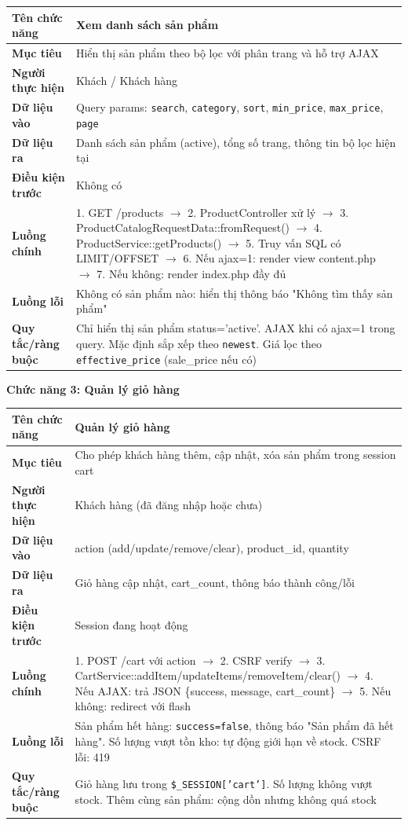 \documentclass[a4paper]{article}
\begin{document}
\begin{longtable}{|p{3.5cm}|p{10.5cm}|}
\hline
\textbf{Tên chức năng} & Xem danh sách sản phẩm \\
\hline
\textbf{Mục tiêu} & Hiển thị sản phẩm theo bộ lọc với phân trang và hỗ trợ AJAX \\
\hline
\textbf{Người thực hiện} & Khách / Khách hàng \\
\hline
\textbf{Dữ liệu vào} & Query params: \texttt{search}, \texttt{category}, \texttt{sort}, \texttt{min\_price}, \texttt{max\_price}, \texttt{page} \\
\hline
\textbf{Dữ liệu ra} & Danh sách sản phẩm (active), tổng số trang, thông tin bộ lọc hiện tại \\
\hline
\textbf{Điều kiện trước} & Không có \\
\hline
\textbf{Luồng chính} & 1. GET /products $\to$ 2. ProductController xử lý $\to$ 3. ProductCatalogRequestData::fromRequest() $\to$ 4. ProductService::getProducts() $\to$ 5. Truy vấn SQL có LIMIT/OFFSET $\to$ 6. Nếu ajax=1: render view content.php $\to$ 7. Nếu không: render index.php đầy đủ \\
\hline
\textbf{Luồng lỗi} & Không có sản phẩm nào: hiển thị thông báo "Không tìm thấy sản phẩm" \\
\hline
\textbf{Quy tắc/ràng buộc} & Chỉ hiển thị sản phẩm status='active'. AJAX khi có ajax=1 trong query. Mặc định sắp xếp theo \texttt{newest}. Giá lọc theo \texttt{effective\_price} (sale\_price nếu có) \\
\hline
\end{longtable}

\vspace{0.5cm}
\noindent\textbf{Chức năng 3: Quản lý giỏ hàng}

\begin{longtable}{|p{3.5cm}|p{10.5cm}|}
\hline
\textbf{Tên chức năng} & Quản lý giỏ hàng \\
\hline
\textbf{Mục tiêu} & Cho phép khách hàng thêm, cập nhật, xóa sản phẩm trong session cart \\
\hline
\textbf{Người thực hiện} & Khách hàng (đã đăng nhập hoặc chưa) \\
\hline
\textbf{Dữ liệu vào} & action (add/update/remove/clear), product\_id, quantity \\
\hline
\textbf{Dữ liệu ra} & Giỏ hàng cập nhật, cart\_count, thông báo thành công/lỗi \\
\hline
\textbf{Điều kiện trước} & Session đang hoạt động \\
\hline
\textbf{Luồng chính} & 1. POST /cart với action $\to$ 2. CSRF verify $\to$ 3. CartService::addItem/updateItems/removeItem/clear() $\to$ 4. Nếu AJAX: trả JSON \{success, message, cart\_count\} $\to$ 5. Nếu không: redirect với flash \\
\hline
\textbf{Luồng lỗi} & Sản phẩm hết hàng: \texttt{success=false}, thông báo "Sản phẩm đã hết hàng". Số lượng vượt tồn kho: tự động giới hạn về stock. CSRF lỗi: 419 \\
\hline
\textbf{Quy tắc/ràng buộc} & Giỏ hàng lưu trong \texttt{\$\_SESSION['cart']}. Số lượng không vượt stock. Thêm cùng sản phẩm: cộng dồn nhưng không quá stock \\
\hline
\end{longtable}
\end{document}
